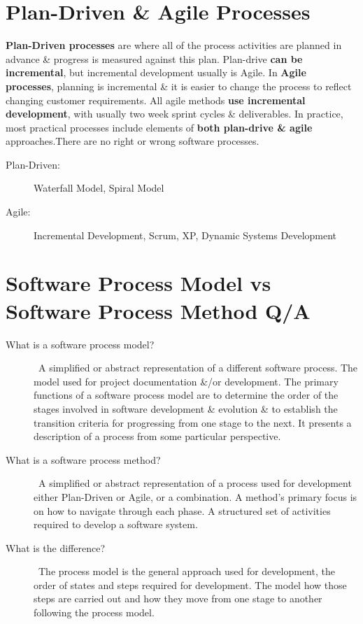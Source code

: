 \documentclass{report}
\begin{document}
\section{Plan-Driven \& Agile Processes}
\noindent \textbf{Plan-Driven processes} are where all of the process activities are planned in advance \& progress is measured against this plan. Plan-drive \textbf{can be incremental}, but incremental development usually is Agile. In \textbf{Agile processes}, planning is incremental \& it is easier to change the process to reflect changing customer requirements. All agile methods \textbf{use incremental development}, with usually two week sprint cycles \& deliverables. In practice, most practical processes include elements of \textbf{both plan-drive \& agile} approaches.\newline There are no right or wrong software processes.
\begin{description}
  \item [Plan-Driven:] Waterfall Model, Spiral Model
  \item [Agile:] Incremental Development, Scrum, XP, Dynamic Systems Development
\end{description}

\section{Software Process Model vs Software Process Method Q/A}
\begin{description}
  \item [What is a software process model?] \ \newline A simplified or abstract representation of a different software process. The model used for project documentation \&/or development. The primary functions of a software process model are to determine the order of the stages involved in software development \& evolution \& to establish the transition criteria for progressing from one stage to the next. It presents a description of a process from some particular perspective.

  \item [What is a software process method?] \ \newline A simplified or abstract representation of a process used for development either Plan-Driven or Agile, or a combination. A method’s primary focus is on how to navigate through each phase. A structured set of activities required to develop a software system.
  \item [What is the difference?] \ \newline The process model is the general approach used for development, the order of states and steps required for development. The model how those steps are carried out and how they move from one stage to another following the process model.
\end{description}
\end{document}
